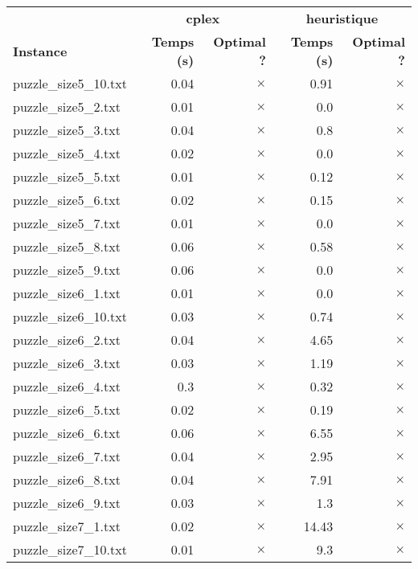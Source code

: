 \documentclass{article}
\begin{document}
\newpage
\begin{center}
\renewcommand{\arraystretch}{1.4} 
\begin{tabular}{lrrrr}
	\hline
 & \multicolumn{2}{c}{\textbf{cplex}} & \multicolumn{2}{c}{\textbf{heuristique}}\\
\textbf{Instance}  & \textbf{Temps (s)} & \textbf{Optimal ?}  & \textbf{Temps (s)} & \textbf{Optimal ?} \\\hline

puzzle\_size5\_10.txt & 0.04 & 
$\times$
 & 0.91 & 
$\times$
\\
puzzle\_size5\_2.txt & 0.01 & 
$\times$
 & 0.0 & 
$\times$
\\
puzzle\_size5\_3.txt & 0.04 & 
$\times$
 & 0.8 & 
$\times$
\\
puzzle\_size5\_4.txt & 0.02 & 
$\times$
 & 0.0 & 
$\times$
\\
puzzle\_size5\_5.txt & 0.01 & 
$\times$
 & 0.12 & 
$\times$
\\
puzzle\_size5\_6.txt & 0.02 & 
$\times$
 & 0.15 & 
$\times$
\\
puzzle\_size5\_7.txt & 0.01 & 
$\times$
 & 0.0 & 
$\times$
\\
puzzle\_size5\_8.txt & 0.06 & 
$\times$
 & 0.58 & 
$\times$
\\
puzzle\_size5\_9.txt & 0.06 & 
$\times$
 & 0.0 & 
$\times$
\\
puzzle\_size6\_1.txt & 0.01 & 
$\times$
 & 0.0 & 
$\times$
\\
puzzle\_size6\_10.txt & 0.03 & 
$\times$
 & 0.74 & 
$\times$
\\
puzzle\_size6\_2.txt & 0.04 & 
$\times$
 & 4.65 & 
$\times$
\\
puzzle\_size6\_3.txt & 0.03 & 
$\times$
 & 1.19 & 
$\times$
\\
puzzle\_size6\_4.txt & 0.3 & 
$\times$
 & 0.32 & 
$\times$
\\
puzzle\_size6\_5.txt & 0.02 & 
$\times$
 & 0.19 & 
$\times$
\\
puzzle\_size6\_6.txt & 0.06 & 
$\times$
 & 6.55 & 
$\times$
\\
puzzle\_size6\_7.txt & 0.04 & 
$\times$
 & 2.95 & 
$\times$
\\
puzzle\_size6\_8.txt & 0.04 & 
$\times$
 & 7.91 & 
$\times$
\\
puzzle\_size6\_9.txt & 0.03 & 
$\times$
 & 1.3 & 
$\times$
\\
puzzle\_size7\_1.txt & 0.02 & 
$\times$
 & 14.43 & 
$\times$
\\
puzzle\_size7\_10.txt & 0.01 & 
$\times$
 & 9.3 & 
$\times$

\end{tabular}
\end{center}
\end{document}

